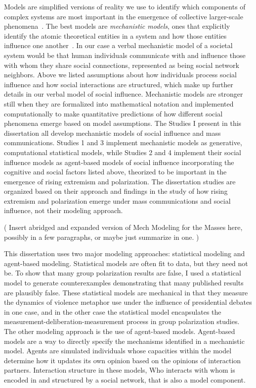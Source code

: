 \documentclass[12pt,letterpaper]{article}
\begin{document}
Models are simplified versions of reality we use to identify which components of
complex systems are most important in the emergence of collective larger-scale
phenomena~\cite{Kauffman1970,Wimsatt1972,Wimsatt1997,Machamer2000,Wimsatt2007,Smaldino2017}.
The best models are \emph{mechanistic models}, ones that explicitly identify the atomic theoretical 
entities in a system and how those entities influence one another~\cite{Machamer2000,Craver2006,Turner2021}. 
In our case a verbal mechanistic model of a societal system would be that
human individuals communicate with and influence those with whom they share
social connections, represented as being social network neighbors. Above we listed
assumptions about how individuals process social influence and how social
interactions are structured, which make up further details in our verbal model
of social influence. Mechanistic models are stronger still when they are 
formalized into mathematical notation and implemented computationally to
make quantitative predictions of how different social phenomena emerge based
on model assumptions. The Studies I present in this dissertation all develop
mechanistic models of social influence and mass communications. Studies 1 and
3 implement mechanistic models as generative, computational statistical models, while
Studies 2 and 4 implement their social influence models as agent-based models
of social influence incorporating the cognitive and social factors listed above,
theorized to be important in the emergence of rising extremism and polarization.
The dissertation studies are organized based on their approach
and findings in the study of how rising extremism and polarization emerge
under mass communications and social influence, not their modeling approach.

(
Insert abridged and expanded version of Mech Modeling for the Masses
here, possibly in a few paragraphs, or maybe just summarize in one.
)

This dissertation uses two major modeling 
approaches: statistical modeling and agent-based modeling. Statistical
models are often fit to data, but they need not be. To show that
many group polarization results are false, I used a statistical model
to generate counterexamples demonstrating that many published results are
plausibly false. These statistical models are mechanical in that they measure
the dynamics of violence metaphor use under the influence of presidential
debates in one case, and in the other case the statistical model encapsulates
the measurement-deliberation-measurement process in group polarization studies. 
The other modeling approach is the use of agent-based
models. Agent-based models are a way to directly specify the mechanisms
identified in a mechanistic model. Agents are simulated individuals whose
capacities within the model determine how it updates its own opinion based on
the opinions of interaction partners. Interaction structure in these models,
Who interacts with whom is encoded in and structured by a social network, that
is also a model component.
\end{document}
